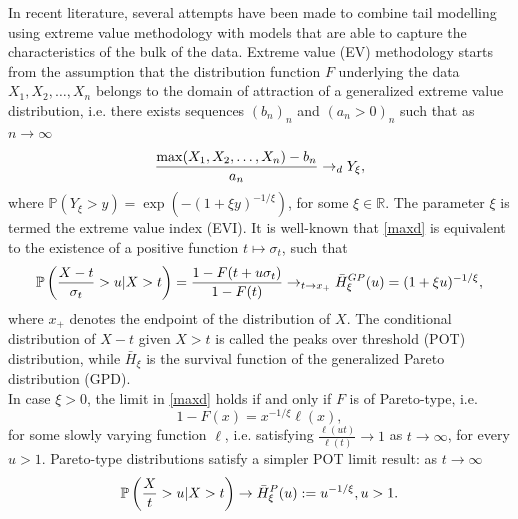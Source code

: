 \documentclass[a4paper,11pt]{article}
\begin{document}
In recent literature, several attempts have been made to combine tail modelling using extreme value methodology with models that are able to capture the characteristics of the bulk of the data. Extreme value (EV) methodology starts from the assumption that the distribution function $F$ underlying the data $X_1, X_2,\ldots,X_n$ belongs to the domain of attraction of a generalized extreme value distribution, i.e.  there exists sequences $(b_n)_n$ and $(a_n>0)_n$ such that as $n \to \infty$
\begin{equation}
{\max (X_1, X_2,\ldots,X_n)-b_n \over a_n} \to _d Y_{\xi},
\label{maxd}
\end{equation}
where $\mathbb{P} (Y_\xi >y) = \exp (-(1+\xi y)^{-1/\xi})$, for some $\xi \in \mathbb{R}$. The parameter $\xi$ is termed the extreme value index (EVI). It is well-known that \eqref{maxd} is equivalent to the existence of a positive function $t \mapsto \sigma_t$, such that 
\begin{equation}
\mathbb{P}\left({X-t \over \sigma_t} >u| X>t \right)
= {1-F(t+u\sigma_t) \over 1-F(t)} \to_{t \to x_+}
\bar{H}^{GP}_{\xi}(u)= (1+\xi u)^{-1/\xi},  
\label{POT}
\end{equation}
where $x_+$ denotes the endpoint of the distribution of $X$. The conditional distribution of $X-t$ given $X>t$ is called the peaks over threshold (POT) distribution, while $\bar{H}_{\xi}$ is the survival function of the generalized Pareto distribution (GPD).\\
In case $\xi >0$, the limit in \eqref{maxd} holds if and only if $F$ is of Pareto-type, i.e.
\begin{equation}
1-F(x) = x^{-1/\xi}\ell (x),
\label{Patype}
\end{equation} 
for some slowly varying function $\ell$, i.e. satisfying $\frac{\ell(ut)}{\ell (t)} \to 1 $ as $t \to \infty$, for every $u>1$. Pareto-type distributions satisfy a simpler POT limit result: as $t \to \infty$
\begin{equation}
\mathbb{P} \left( {X \over t} >u | X>t \right) \to \bar{H}^P_{\xi}(u) := u^{-1/\xi}, u>1. 
\label{POTPa}
\end{equation}
\end{document}
